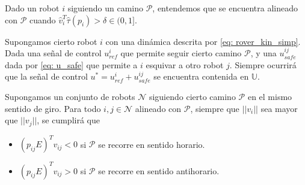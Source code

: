 \vspace{0.2cm}

\begin{definition}
    Dado un robot $i$ siguiendo un camino $\mathcal{P}$, entendemos que se encuentra alineado con $\mathcal{P}$ cuando $\hat v_i^T \hat\tau(p_i) > \delta \in (0,1]$.
\end{definition}

\vspace{0.2cm}

\begin{suposicion} \label{sup: u_alcanzable}
    Supongamos cierto robot $i$ con una dinámica descrita por \eqref{eq: rover_kin_simp}. Dada una señal de control $u_{ref}^i$ que permite seguir cierto camino $\mathcal{P}$, y una $u_{safe}^{ij}$ dada por \ref{eq: u_safe} que permite a $i$ esquivar a otro robot $j$. Siempre ocurrirá que la señal de control $u^* = u_{ref}^i + u_{safe}^{ij}$ se encuentra contenida en $\mathds{U}$.
\end{suposicion}

\vspace{0.2cm}


\begin{suposicion}  \label{sup: conos}
    Supongamos un conjunto de robots $\mathcal{N}$ siguiendo cierto camino $\mathcal{P}$ en el mismo sentido de giro. Para todo $i,j \in \mathcal{N}$ alineado con $\mathcal{P}$, siempre que $||v_i||$ sea mayor que $||v_j||$, se cumplirá que
    \begin{itemize}
        \item $(p_{ij} E)^T v_{ij} < 0$ si $\mathcal{P}$ se recorre en sentido horario.\\
        \item $(p_{ij} E)^T v_{ij} > 0$ si $\mathcal{P}$ se recorre en sentido antihorario.
    \end{itemize}
\end{suposicion}

\vspace{0.2cm}

